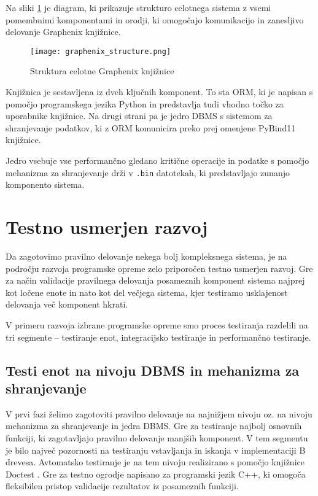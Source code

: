 \documentclass[a4paper,12pt,openright]{book}
\begin{document}
    Na sliki \ref{graphenix_structure} je diagram, ki prikazuje strukturo celotnega sistema z vsemi pomembnimi komponentami in orodji, ki omogočajo komunikacijo in zanesljivo delovanje Graphenix knjižnice.
    
    \begin{figure}[H]
            \centerline{\texttt{[image: graphenix\_structure.png]}}
            \caption{Struktura celotne Graphenix knjižnice}
        \label{graphenix_structure}
    \end{figure}

    \noindent
    Knjižnica je sestavljena iz dveh ključnih komponent. To sta ORM, ki je napisan s pomočjo programskega jezika Python in predstavlja tudi vhodno točko za uporabnike knjižnice. Na drugi strani pa je jedro DBMS s sistemom za shranjevanje podatkov, ki z ORM komunicira preko prej omenjene PyBind11 \cite{PYBIND11_GITHUB} knjižnice.

    Jedro vsebuje vse performančno gledano kritične operacije in podatke s pomočjo mehanizma za shranjevanje drži v {\tt .bin} datotekah, ki predstavljajo zunanjo komponento sistema.
    
    \section{Testno usmerjen razvoj}

    Da zagotovimo pravilno delovanje nekega bolj kompleksnega sistema, je na področju razvoja programske opreme zelo priporočen testno usmerjen razvoj. Gre za način validacije pravilnega delovanja posameznih komponent sistema najprej kot ločene enote in nato kot del večjega sistema, kjer testiramo usklajenost delovanja več komponent hkrati.
    
    V primeru razvoja izbrane programske opreme smo proces testiranja razdelili na tri segmente – testiranje enot, integracijsko testiranje in performančno testiranje.
   
   \subsection{Testi enot na nivoju DBMS in mehanizma za shranjevanje}

    V prvi fazi želimo zagotoviti pravilno delovanje na najnižjem nivoju oz. na nivoju mehanizma za shranjevanje in jedra DBMS. Gre za testiranje najbolj osnovnih funkciji, ki zagotavljajo pravilno delovanje manjših komponent. V tem segmentu je bilo največ pozornosti na testiranju vstavljanja in iskanja v implementaciji B drevesa. Avtomatsko testiranje je na tem nivoju realizirano s pomočjo knjižnice Doctest \cite{DOCTEST_GITHUB}. Gre za testno ogrodje napisano za programski jezik C++, ki omogoča fleksibilen pristop validacije rezultatov iz posameznih funkciji.
   
\end{document}
